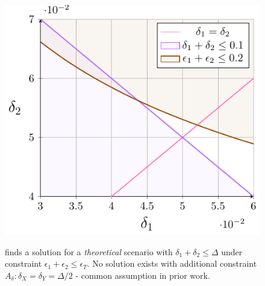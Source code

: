 \begin{figure}
    \centering
    \includegraphics[width=0.75\linewidth,alt={Feasible region under inequalities and line corresponding to equal $\delta_1=\delta_2$. \AVOIRmethodname{} can find a solution even when previous methods with balanced $delta$ cannot.}]{avoir/images/concrete-example-tikz}
%                
    \caption{\AVOIRmethodname{} finds a solution for a \textit{theoretical} scenario with $\delta_1 + \delta_2 \leq \Delta$ under constraint $\epsilon_1 + \epsilon_2 \leq \epsilon_T$. No solution exists with additional constraint $A_\delta: \delta_X = \delta_Y = \Delta/2$ - common assumption in prior work.}
    \label{fig:theoretical-example}
\end{figure}


